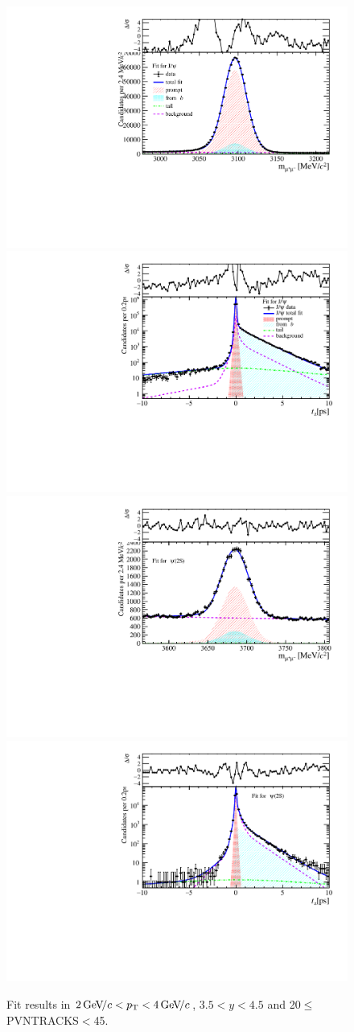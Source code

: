 \begin{figure}[H]
\begin{center}
\includegraphics[width=0.47\linewidth]{pdf/Jpsi/drawmass/n2y3pt2.pdf}
\includegraphics[width=0.47\linewidth]{pdf/Jpsi/2DFit/n2y3pt2.pdf}
\vspace*{-0.5cm}
\includegraphics[width=0.47\linewidth]{pdf/Psi2S/drawmass/n2y3pt2.pdf}
\includegraphics[width=0.47\linewidth]{pdf/Psi2S/2DFit/n2y3pt2.pdf}
\vspace*{-0.5cm}
\end{center}
\caption{Fit results in $2\text{\,Ge\kern -0.1em V\!/}c<p_{\mathrm{T}}<4\text{\,Ge\kern -0.1em V\!/}c$, $3.5<y<4.5$ and 20$\leq$PVNTRACKS$<$45.}
\label{Fitn2y3pt2}
\end{figure}
